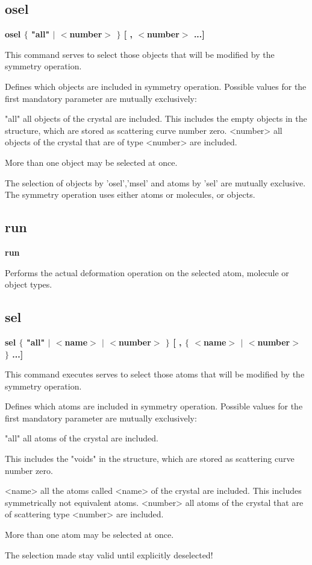 \subsection*{osel}
{\bf osel $ \{$ "all" $| $ $ <$number$> $ $\} $ [ , $ <$number$> $ ...] \par }
\par
\vspace{3pt}
This command serves to select 
those objects that will be modified by the symmetry operation. 
\par
Defines which objects are included in symmetry operation. Possible values 
for the first mandatory parameter are mutually exclusively: 
\par
\begin{MacVerbatim}
"all"     all objects of the crystal are included.
          This includes the empty objects in the structure, which are
          stored as scattering curve number zero.
<number>  all objects of the crystal that are of type <number>
          are included.
\end{MacVerbatim}
More than one object may be selected at once. 
\par
The selection of objects by 'osel','msel' and atoms by 'sel' are mutually 
exclusive. The symmetry operation uses either atoms or molecules, 
or objects. 
\subsection*{run}
{\bf run \par }
\par
\vspace{3pt}
Performs the actual deformation operation on the selected 
atom, molecule or object types. 
\subsection*{sel}
{\bf sel $ \{$ "all" $| $ $ <$name$> $ $| $ $ <$number$> $ $\} $ [ , $ \{$ $ <$name$> $ $| $ $ <$number$> $ $\} $ ...] \par }
\par
\vspace{3pt}
This command executes serves to select 
those atoms that will be modified by the symmetry operation. 
\par
Defines which atoms are included in symmetry operation. Possible values 
for the first mandatory parameter are mutually exclusively: 
\par
\begin{MacVerbatim}
"all"     all atoms of the crystal are included.
\end{MacVerbatim}
          This includes the "voids" in the structure, which are stored 
          as scattering curve number zero. 
\begin{MacVerbatim}
<name>    all the atoms called <name> of the crystal are included.
          This includes symmetrically not equivalent atoms.
<number>  all atoms of the crystal that are of scattering type <number>
          are included.
\end{MacVerbatim}
More than one atom may be selected at once. 
\par
The selection made stay valid until explicitly deselected! 
